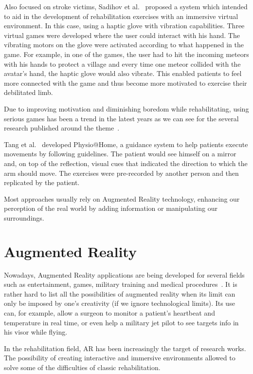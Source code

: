 Also focused on stroke victims, Sadihov et al.~\cite{Sadihov2013} proposed a system which intended to aid in the development of 
rehabilitation exercises with an immersive virtual environment. In this case, using a haptic glove with vibration capabilities.  
Three virtual games were developed where the user could interact with his hand. The vibrating motors on the glove 
were activated according to what happened in the game. For example, in one of the games, the user had to hit 
the incoming meteors with his hands to protect a village and every time one meteor collided with the avatar's hand,
the haptic glove would also vibrate. This enabled patients to feel more connected with the game and thus become more motivated to exercise their debilitated limb.

Due to improving motivation and diminishing boredom while rehabilitating, using serious games
has been a trend in the latest years as we can see for the several 
research published around the theme~\cite{Schonauer2011c, Ma2008, Burke2009, Borghese2013, Lange2012}. 

Tang et al.~\cite{Tang2014a} developed Physio@Home, a guidance system to help patients execute movements by following
guidelines. The patient would see himself on a mirror and, on top of the reflection, visual cues that 
indicated the direction to which the arm should move. The exercises were pre-recorded by another person and 
then replicated by the patient.

Most approaches usually rely on Augmented Reality technology, enhancing our perception of the real world
by adding information or manipulating our surroundings.  

\section{Augmented Reality}
\label{RW-AR}

Nowadays, Augmented Reality applications 
are being developed for several fields such as entertainment, games, military training 
and medical procedures~\cite{Guimaraes2014a, Rego2010}. 
It is rather hard to list all the possibilities of augmented reality when its limit can only be imposed by one's creativity (if we ignore technological limits).
Its use can, for example, allow a surgeon to monitor a patient's heartbeat 
and temperature in real time, or even help a military jet pilot to see targets info in his visor while flying.

In the rehabilitation field, \ac{AR} has been increasingly the target of research works.
The possibility of creating interactive and immersive environments
allowed to solve some of the difficulties of classic rehabilitation.

